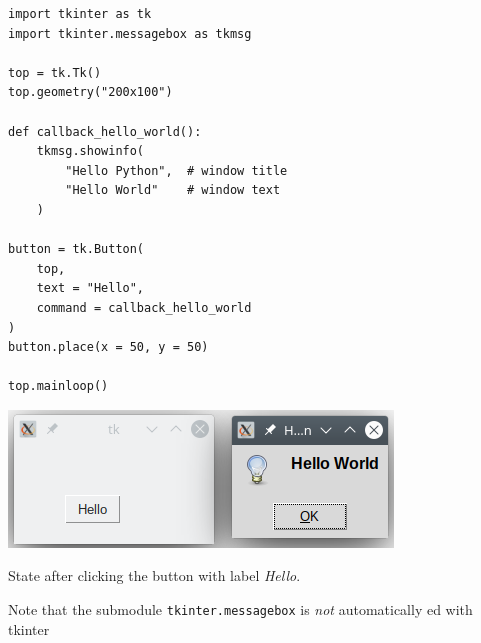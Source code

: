 \begin{frame}[fragile]
%
\begin{tcbraster}[raster columns=2,
                  raster equal height,
                  nobeforeafter,
                  raster column skip=0.5cm]
\begin{codebox}
\begin{verbatim}
import tkinter as tk
import tkinter.messagebox as tkmsg

top = tk.Tk()
top.geometry("200x100")

def callback_hello_world():
    tkmsg.showinfo(
        "Hello Python",  # window title
        "Hello World"    # window text
    )

button = tk.Button(
    top,
    text = "Hello",
    command = callback_hello_world
)
button.place(x = 50, y = 50)

top.mainloop()
\end{verbatim}
\end{codebox}
%
\begin{tcolorbox}[title=Output: Hello World]
\begin{center}
\includegraphics[width=\linewidth]{./gfx/12-tk-button}
\end{center}
\footnotesize
State after clicking the button with label \emph{Hello}.

\vspace{3pt}
Note that the submodule \texttt{tkinter.messagebox} is \emph{not} automatically ed with tkinter
\end{tcolorbox}
\end{tcbraster}
%
\end{frame}


